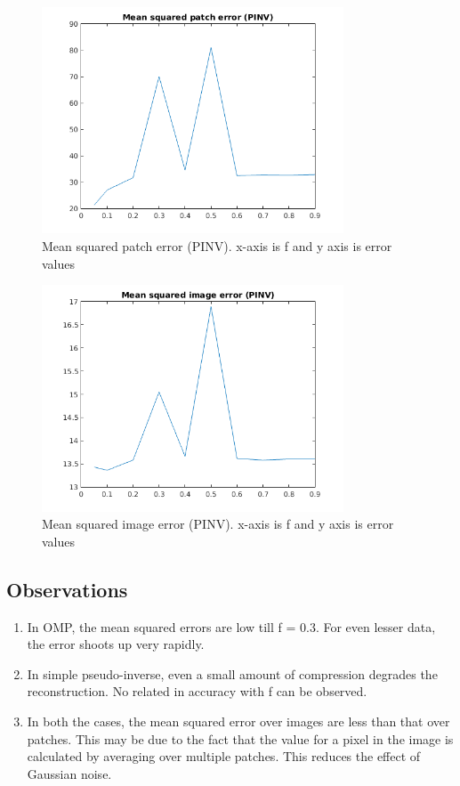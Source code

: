 \documentclass{article}
\begin{document}
\begin{figure}[!h]
    \centering
    \includegraphics[width=0.8\textwidth]{mspe_pinv}
    \caption{Mean squared patch error (PINV). x-axis is f and y axis is error values}
\end{figure}

\begin{figure}[!h]
    \centering
    \includegraphics[width=0.8\textwidth]{msie_pinv}
    \caption{Mean squared image error (PINV). x-axis is f and y axis is error values}
\end{figure}


\subsection*{Observations}
\begin{enumerate}
    \item In OMP, the mean squared errors are low till f = 0.3. For even lesser data, the error shoots up very rapidly.
    \item In simple pseudo-inverse, even a small amount of compression degrades the reconstruction. No related in accuracy with f can be observed.
    \item In both the cases, the mean squared error over images are less than that over patches. This may be due to the fact that the value for a pixel in the image is calculated by averaging over multiple patches. This reduces the effect of Gaussian noise.
\end{enumerate}
\end{document}
